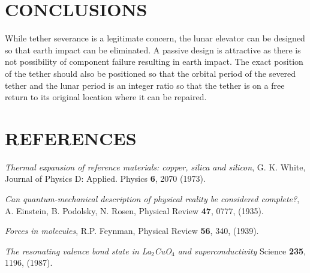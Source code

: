 \documentclass[twocolumn,prl,nobalancelastpage,aps,10pt]{revtex4-1}
\begin{document}
\section{CONCLUSIONS}

While tether severance is a legitimate concern, the lunar elevator can be designed so that earth impact can be eliminated. A passive design is attractive as there is not possibility of component failure resulting in earth impact. The exact position of the tether should also be positioned so that the orbital period of the severed tether and the lunar period is an integer ratio so that the tether is on a free return to its original location where it can be repaired.

\section{REFERENCES}

\begin{thebibliography}{99}
 \textit{Thermal expansion of reference materials: copper, silica and silicon}, G. K. White,  Journal of Physics D: Applied. Physics  \textbf{6}, 2070 (1973).

 \textit{Can quantum-mechanical description of physical reality be considered complete?}, A. Einstein, B. Podolsky, N. Rosen, Physical Review \textbf{47}, 0777, (1935).

 \textit{Forces in molecules}, R.P. Feynman, Physical Review \textbf{56}, 340, (1939).

 \textit{The resonating valence bond state in La$_2$CuO$_4$ and superconductivity} Science \textbf{235}, 1196, (1987).

\end{thebibliography}
\end{document}
